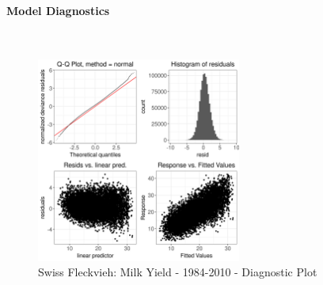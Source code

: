 \paragraph{Model Diagnostics} \quad \\
\begin{figure}[H]
    \centering
    \includegraphics[width=0.6\textwidth]{thesis/figures/models/milk/before2010/sf_milk_before2010/sf_milk_before2010_diagnostics.png}
    \caption[]{Swiss Fleckvieh: Milk Yield - 1984-2010 - Diagnostic Plot}
\end{figure}

\newpage
